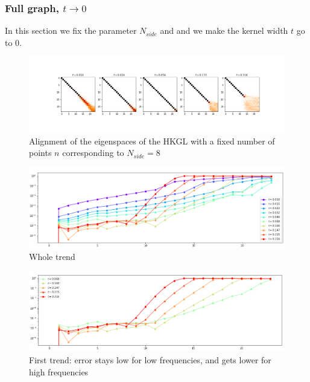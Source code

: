 \subsubsection{Full graph, $t\to 0$}
In this section we fix the parameter $N_{side}$ and and we make the kernel width $t$ go to $0$. 
\begin{figure}[h]
	\centering
	\includegraphics[width=\textwidth]{../codes/02.HeatKernelGraphLaplacian/HEALPix/06_figures/t_sensitivity}
	\caption{\label{fig:t_sensitivity_eigenspaces}Alignment of the eigenspaces of the HKGL with a fixed number of points $n$ corresponding to $N_{side}=8$}
\end{figure}
\begin{figure}
	\centering
	\includegraphics[width=\textwidth]{../codes/02.HeatKernelGraphLaplacian/HEALPix/06_figures/t_sensitivity_diagonal.png}
	\caption{\label{fig:t_sensitivity_diagonal}Whole trend}
\end{figure}%
\begin{figure}
	\centering
	\includegraphics[width=\textwidth]{../codes/02.HeatKernelGraphLaplacian/HEALPix/06_figures/t_sensitivity_diagonal_2.png}
	\caption{\label{fig:t_sensitivity_diagonal_2}First trend: error stays low for low frequencies, and gets lower for high frequencies}
	\vspace{0.5cm}
\end{figure}
